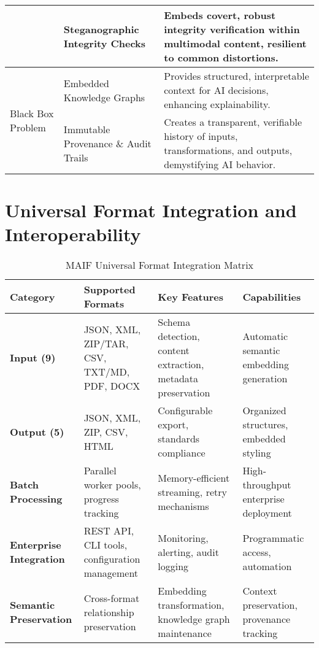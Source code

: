 \documentclass[conference]{IEEEtran}
\begin{document}
\begin{table*}[!t]
\begin{tabular}{p{3cm}p{5cm}p{5.5cm}}
& Steganographic Integrity Checks\cite{ref73} & Embeds covert, robust integrity verification within multimodal content, resilient to common distortions. \\
\midrule
\multirow{3}{3cm}{Black Box Problem} & Embedded Knowledge Graphs\cite{ref42} & Provides structured, interpretable context for AI decisions, enhancing explainability. \\
& Immutable Provenance \& Audit Trails\cite{ref9} & Creates a transparent, verifiable history of inputs, transformations, and outputs, demystifying AI behavior. \\
\bottomrule
\end{tabular}
\end{table*}

\section{Universal Format Integration and Interoperability}

\begin{table*}[!t]
\renewcommand{\arraystretch}{1.3}
\caption{MAIF Universal Format Integration Matrix}
\label{tab:format-integration}
\centering
\footnotesize
\begin{tabular}{p{2.5cm}p{4cm}p{4cm}p{3.5cm}}
\toprule
\textbf{Category} & \textbf{Supported Formats} & \textbf{Key Features} & \textbf{Capabilities} \\
\midrule
\textbf{Input (9)} & JSON, XML, ZIP/TAR, CSV, TXT/MD, PDF, DOCX & Schema detection, content extraction, metadata preservation & Automatic semantic embedding generation \\
\textbf{Output (5)} & JSON, XML, ZIP, CSV, HTML & Configurable export, standards compliance & Organized structures, embedded styling \\
\textbf{Batch Processing} & Parallel worker pools, progress tracking & Memory-efficient streaming, retry mechanisms & High-throughput enterprise deployment \\
\textbf{Enterprise Integration} & REST API, CLI tools, configuration management & Monitoring, alerting, audit logging & Programmatic access, automation \\
\textbf{Semantic Preservation} & Cross-format relationship preservation & Embedding transformation, knowledge graph maintenance & Context preservation, provenance tracking \\
\bottomrule
\end{tabular}
\end{table*}
\end{document}
